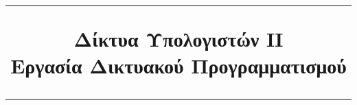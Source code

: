 

\title{%
  \vspace{0.3cm}%
  \hrule height 2pt%
  \vspace{0.3cm} Δίκτυα Υπολογιστών ΙΙ\\
  Εργασία Δικτυακού Προγραμματισμού%
  \vspace{0.3cm}%
  \hrule height 2pt%
  \vspace{0.3cm}
}


\deactivateBG
\maketitle
\tableofcontents
\listoflistings
\listoffigures
\listoftables
\clearpage %
\activateBG
{}
\setcounter{page}{1}









